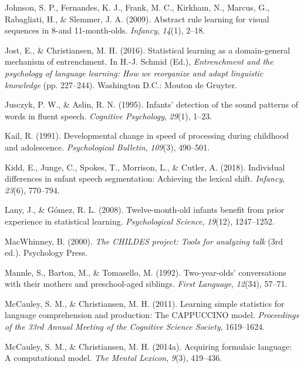 \documentclass[man,mask,floatsintext]{apa6}
\theoremstyle{definition}
\theoremstyle{definition}
\theoremstyle{definition}
\theoremstyle{remark}
\begin{document}
\hypertarget{ref-johnson2009abstract}{}
Johnson, S. P., Fernandes, K. J., Frank, M. C., Kirkham, N., Marcus, G.,
Rabagliati, H., \& Slemmer, J. A. (2009). Abstract rule learning for
visual sequences in 8-and 11-month-olds. \emph{Infancy}, \emph{14}(1),
2--18.

\hypertarget{ref-jost201610}{}
Jost, E., \& Christiansen, M. H. (2016). Statistical learning as a
domain-general mechanism of entrenchment. In H.-J. Schmid (Ed.),
\emph{Entrenchment and the psychology of language learning: How we
reorganize and adapt linguistic knowledge} (pp. 227--244). Washington
D.C.: Mouton de Gruyter.

\hypertarget{ref-jusczyk1995infants}{}
Jusczyk, P. W., \& Aslin, R. N. (1995). Infants' detection of the sound
patterns of words in fluent speech. \emph{Cognitive Psychology},
\emph{29}(1), 1--23.

\hypertarget{ref-kail1991developmental}{}
Kail, R. (1991). Developmental change in speed of processing during
childhood and adolescence. \emph{Psychological Bulletin}, \emph{109}(3),
490--501.

\hypertarget{ref-kidd2018individual}{}
Kidd, E., Junge, C., Spokes, T., Morrison, L., \& Cutler, A. (2018).
Individual differences in snfant speech segmentation: Achieving the
lexical shift. \emph{Infancy}, \emph{23}(6), 770--794.

\hypertarget{ref-lany2008twelve}{}
Lany, J., \& Gómez, R. L. (2008). Twelve-month-old infants benefit from
prior experience in statistical learning. \emph{Psychological Science},
\emph{19}(12), 1247--1252.

\hypertarget{ref-childes}{}
MacWhinney, B. (2000). \emph{The CHILDES project: Tools for analyzing
talk} (3rd ed.). Psychology Press.

\hypertarget{ref-mannle1992twoyearolds}{}
Mannle, S., Barton, M., \& Tomasello, M. (1992). Two-year-olds'
conversations with their mothers and preschool-aged siblings.
\emph{First Language}, \emph{12}(34), 57--71.

\hypertarget{ref-mccauley2011learning}{}
McCauley, S. M., \& Christiansen, M. H. (2011). Learning simple
statistics for language comprehension and production: The CAPPUCCINO
model. \emph{Proceedings of the 33rd Annual Meeting of the Cognitive
Science Society}, 1619--1624.

\hypertarget{ref-mccauley2014acquiring}{}
McCauley, S. M., \& Christiansen, M. H. (2014a). Acquiring formulaic
language: A computational model. \emph{The Mental Lexicon}, \emph{9}(3),
419--436.
\end{document}
